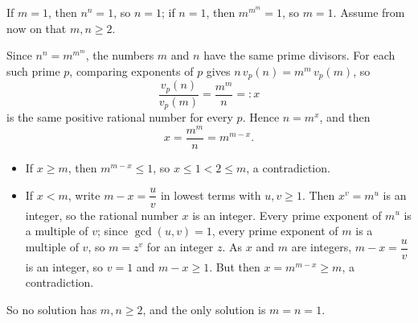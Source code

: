 If $m=1$, then $n^n=1$, so $n=1$; if $n=1$, then $m^{m^m}=1$, so $m=1$. Assume from now on that $m,n\ge2$.

Since $n^n=m^{m^m}$, the numbers $m$ and $n$ have the same prime divisors. For each such prime $p$, comparing exponents of $p$ gives $n\,v_p(n)=m^m\,v_p(m)$, so
\[\dfrac{v_p(n)}{v_p(m)}=\dfrac{m^m}{n}=:x\]
is the same positive rational number for every $p$. Hence $n=m^x$, and then
\[x=\dfrac{m^m}{n}=m^{m-x}.\]
\begin{itemize}
\item If $x\ge m$, then $m^{m-x}\le1$, so $x\le1<2\le m$, a contradiction.
\item If $x<m$, write $m-x=\dfrac uv$ in lowest terms with $u,v\ge1$. Then $x^v=m^u$ is an integer, so the rational number $x$ is an integer. Every prime exponent of $m^u$ is a multiple of $v$; since $\gcd(u,v)=1$, every prime exponent of $m$ is a multiple of $v$, so $m=z^v$ for an integer $z$. As $x$ and $m$ are integers, $m-x=\dfrac uv$ is an integer, so $v=1$ and $m-x\ge1$. But then $x=m^{m-x}\ge m$, a contradiction.
\end{itemize}
So no solution has $m,n\ge2$, and the only solution is $\boxed{m=n=1}$.
